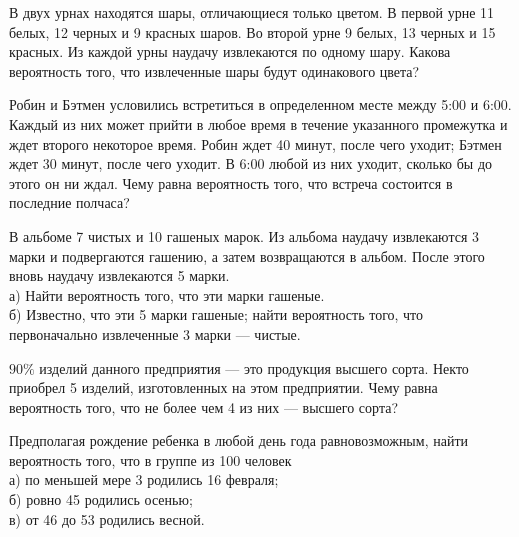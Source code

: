 \newpage\setcounter{zad}{0}



\begin{zkrW}{20}\noindent 
	В двух урнах находятся шары, отличающиеся только цветом. В первой урне 11 белых, 12 черных и 9 красных шаров. Во второй урне 9 белых, 13 черных и 15 красных. Из каждой урны наудачу извлекаются по одному шару. Какова вероятность того, что извлеченные шары будут одинакового цвета?
 
\end{zkrW}

\begin{zkrW}{20}\noindent 
	Робин и Бэтмен условились встретиться в определенном месте между 5:00 и 6:00. Каждый из них может прийти в любое время в течение указанного промежутка и ждет второго некоторое время. Робин ждет 40 минут, после чего уходит; Бэтмен ждет 30 минут, после чего уходит. В 6:00 любой из них уходит, сколько бы до этого он ни ждал. Чему равна вероятность того, что встреча состоится в последние полчаса?
 
\end{zkrW}

\begin{zkrW}{20}\noindent 
	В альбоме 7 чистых и 10 гашеных марок. Из альбома наудачу извлекаются 3 марки и подвергаются гашению, а затем возвращаются в альбом. После этого вновь наудачу извлекаются 5 марки. \\ \indent а) Найти вероятность того, что эти марки гашеные. \\ \indent б) Известно, что эти 5 марки гашеные; найти вероятность того, что первоначально извлеченные 3 марки --- чистые.
 
\end{zkrW}

\begin{zkrW}{20}\noindent 
	$90\%$ изделий данного предприятия — это продукция высшего сорта. Некто приобрел 5 изделий, изготовленных на этом предприятии. Чему равна вероятность того, что не более чем 4 из них — высшего сорта?
 
\end{zkrW}

\begin{zkrW}{20}\noindent 
	Предполагая рождение ребенка в любой день года равновозможным, найти вероятность того, что в группе из 100 человек \\ \indent а) по меньшей мере 3 родились 16 февраля; \\ \indent б) ровно 45 родились осенью; \\ \indent в) от 46 до 53 родились весной.
 
\end{zkrW}

